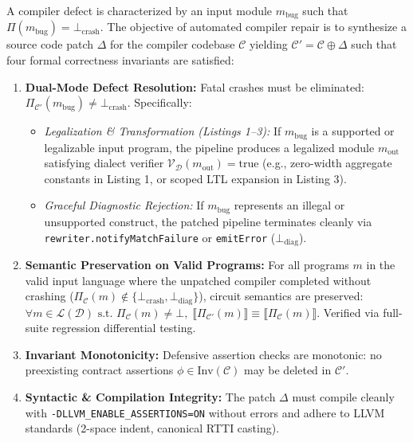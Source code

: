 \documentclass[conference]{IEEEtran}
\begin{document}
A compiler defect is characterized by an input module $m_{\text{bug}}$ such that $\Pi(m_{\text{bug}}) = \bot_{\text{crash}}$. The objective of automated compiler repair is to synthesize a source code patch $\Delta$ for the compiler codebase $\mathcal{C}$ yielding $\mathcal{C}' = \mathcal{C} \oplus \Delta$ such that four formal correctness invariants are satisfied:
\begin{enumerate}
    \item \textbf{Dual-Mode Defect Resolution:} Fatal crashes must be eliminated: $\Pi_{\mathcal{C}'}(m_{\text{bug}}) \neq \bot_{\text{crash}}$. Specifically:
    \begin{itemize}
        \item[(a)] \textit{Legalization \& Transformation (Listings 1--3):} If $m_{\text{bug}}$ is a supported or legalizable input program, the pipeline produces a legalized module $m_{\text{out}}$ satisfying dialect verifier $\mathcal{V}_{\mathcal{D}}(m_{\text{out}}) = \text{true}$ (e.g., zero-width aggregate constants in Listing 1, or scoped LTL expansion in Listing 3).
        \item[(b)] \textit{Graceful Diagnostic Rejection:} If $m_{\text{bug}}$ represents an illegal or unsupported construct, the patched pipeline terminates cleanly via \texttt{rewriter.notifyMatchFailure} or \texttt{emitError} ($\bot_{\text{diag}}$).
    \end{itemize}
    \item \textbf{Semantic Preservation on Valid Programs:} For all programs $m$ in the valid input language where the unpatched compiler completed without crashing ($\Pi_{\mathcal{C}}(m) \notin \{\bot_{\text{crash}}, \bot_{\text{diag}}\}$), circuit semantics are preserved: $\forall m \in \mathcal{L}(\mathcal{D}) \text{ s.t. } \Pi_{\mathcal{C}}(m) \neq \bot, \; \llbracket \Pi_{\mathcal{C}'}(m) \rrbracket \equiv \llbracket \Pi_{\mathcal{C}}(m) \rrbracket$. Verified via full-suite regression differential testing.
    \item \textbf{Invariant Monotonicity:} Defensive assertion checks are monotonic: no preexisting contract assertions $\phi \in \text{Inv}(\mathcal{C})$ may be deleted in $\mathcal{C}'$.
    \item \textbf{Syntactic \& Compilation Integrity:} The patch $\Delta$ must compile cleanly with \texttt{-DLLVM\_ENABLE\_ASSERTIONS=ON} without errors and adhere to LLVM standards (2-space indent, canonical RTTI casting).
\end{enumerate}
\end{document}
